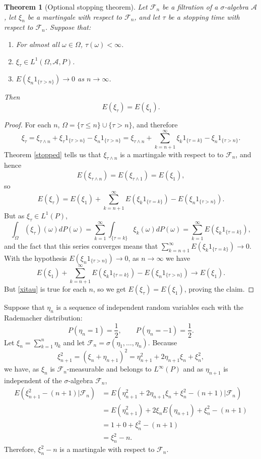 \documentclass{article}
\newtheorem{theorem}{Theorem}
\theoremstyle{definition}
\begin{document}
\begin{theorem}[Optional stopping theorem]
Let $\mathscr{F}_n$ be a filtration of a $\sigma$-algebra $\mathscr{A}$, let $\xi_n$ be a martingale with respect to $\mathscr{F}_n$, and let
$\tau$ be a stopping time with respect to $\mathscr{F}_n$. Suppose that:
\begin{enumerate}
\item For almost all $\omega \in \Omega$, $\tau(\omega)<\infty$.
\item $\xi_\tau \in L^1(\Omega,\mathscr{A},P)$.
\item $E(\xi_n 1_{\{\tau>n\}}) \to 0$ as $n \to \infty$.
\end{enumerate}
Then
\[
E(\xi_\tau)=E(\xi_1).
\]
\end{theorem}
\begin{proof}
For each $n$, $\Omega = \{\tau \leq n\} \cup \{\tau>n\}$, and therefore
\[
\xi_\tau = \xi_{\tau \wedge n} + \xi_\tau 1_{\{\tau>n\}} -  \xi_n 1_{\{\tau>n\}}
=\xi_{\tau \wedge n}  + \sum_{k=n+1}^\infty \xi_k 1_{\{\tau=k\}} - \xi_n 1_{\{\tau>n\}}.
\]
Theorem \ref{stopped} tells us that $\xi_{\tau \wedge n}$ is a martingale with respect to to $\mathscr{F}_n$, and hence
\[
E(\xi_{\tau \wedge n}) = E(\xi_{\tau \wedge 1}) = E(\xi_1),
\]
so
\begin{equation}
E(\xi_\tau) = E(\xi_1) + \sum_{k=n+1}^\infty E(\xi_k 1_{\{\tau=k\}}) -  E(\xi_n 1_{\{\tau>n\}}).
\label{xitau}
\end{equation}
But as $\xi_\tau \in L^1(P)$,
\[
\int_{\Omega} (\xi_\tau)(\omega) dP(\omega) = \sum_{k=1}^\infty 
\int_{\{\tau=k\}} \xi_k(\omega) dP(\omega)
=\sum_{k=1}^\infty E(\xi_k 1_{\{\tau=k\}}),
\]
and the fact that this series converges means that $\sum_{k=n+1}^\infty E(\xi_k 1_{\{\tau=k\}}) \to 0$. With the hypothesis
$E(\xi_n 1_{\{\tau>n\}}) \to 0$, as $n \to \infty$ we have
\[
E(\xi_1) + \sum_{k=n+1}^\infty E(\xi_k 1_{\{\tau=k\}}) -  E(\xi_n 1_{\{\tau>n\}}) \to E(\xi_1).
\]
But \eqref{xitau} is true for each $n$, so we get $E(\xi_\tau)=E(\xi_1)$, proving the claim.
\end{proof}

Suppose that $\eta_n$ is a sequence of independent random variables each with the Rademacher distribution:
\[
P(\eta_n=1)=\frac{1}{2},\qquad P(\eta_n=-1)=\frac{1}{2}.
\]
Let $\xi_n=\sum_{k=1}^n \eta_k$ and let $\mathscr{F}_n=\sigma(\eta_1,\ldots,\eta_n)$.
Because
\[
\xi_{n+1}^2 = (\xi_n+\eta_{n+1})^2 = \eta_{n+1}^2 + 2 \eta_{n+1} \xi_n + \xi_n^2,
\]
we have, as $\xi_n$ is $\mathscr{F}_n$-measurable and belongs to $L^\infty(P)$ and as $\eta_{n+1}$ is independent of the $\sigma$-algebra
$\mathscr{F}_n$,
\begin{align*}
E(\xi_{n+1}^2-(n+1) | \mathscr{F}_n) &= E( \eta_{n+1}^2 + 2 \eta_{n+1} \xi_n + \xi_n^2 - (n+1)| \mathscr{F}_n)\\
&=E(\eta_{n+1}^2)+2\xi_n E(\eta_{n+1})+\xi_n^2 - (n+1)\\
&=1+0+\xi_n^2-(n+1)\\
&=\xi_n^2-n.
\end{align*}
Therefore, $\xi_n^2-n$ is a martingale with respect to $\mathscr{F}_n$. 
\end{document}
